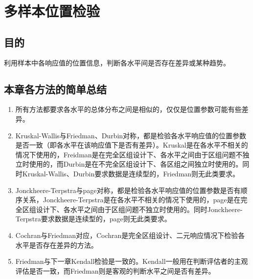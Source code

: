 \chapter{多样本位置检验}
\section{目的}
利用样本中各响应值的位置信息，判断各水平间是否存在差异或某种趋势。
\section{本章各方法的简单总结}
\begin{enumerate}
	\item 所有方法都要求各水平的总体分布之间是相似的，仅仅是位置参数可能有些差异。
	\item Kruskal-Wallis与Friedman、Durbin对称，都是检验各水平响应值的位置参数是否一致（即各水平在该响应值下是否有差异）。Kruskal是在各水平不相关的情况下使用的，Freidman是在完全区组设计下、各水平之间由于区组问题不独立时使用的，而Durbin是在不完全区组设计下、各区组之间独立时使用的。同时Kruskal-Wallis、Durbin要求数据是连续型的，Friedman则无此类要求。
	\item Jonckheere-Terpstra与page对称，都是检验各水平响应值的位置参数是否有顺序关系，Jonckheere-Terpstra是在各水平不相关的情况下使用的，page是在完全区组设计下、各水平之间由于区组问题不独立时使用的。同时Jonckheere-Terpstra要求数据是连续型的，page则无此类要求。
	\item Cochran与Friedman对应，Cochran是完全区组设计、二元响应情况下检验各水平是否存在差异的方法。
	\item Friedman与下一章Kendall检验是一致的。Kendall一般用在判断评估者的主观评估是否一致，而Friedman则是客观的判断水平之间是否有差异。
\end{enumerate}





